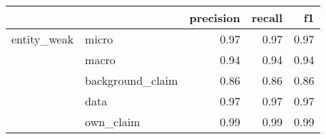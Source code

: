 \begin{tabular}{llrrr}
\toprule
            &           &  precision &  recall &   f1 \\
\midrule
entity\_weak & micro &       0.97 &    0.97 & 0.97 \\
            & macro &       0.94 &    0.94 & 0.94 \\
            & background\_claim &       0.86 &    0.86 & 0.86 \\
            & data &       0.97 &    0.97 & 0.97 \\
            & own\_claim &       0.99 &    0.99 & 0.99 \\
\bottomrule
\end{tabular}
